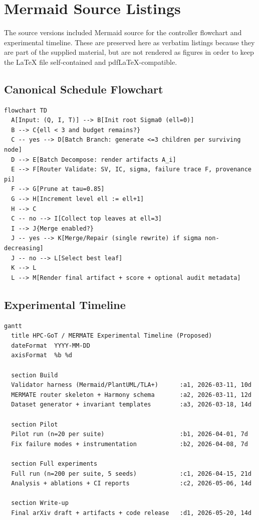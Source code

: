 \documentclass[11pt,a4paper]{article}
\numberwithin{equation}{section}
\theoremstyle{definition}
\begin{document}
\section{Mermaid Source Listings}
\label{app:mermaid}

The source versions included Mermaid source for the controller flowchart and experimental timeline. These are preserved here as verbatim listings because they are part of the supplied material, but are not rendered as figures in order to keep the LaTeX file self-contained and pdf\LaTeX-compatible.

\subsection{Canonical Schedule Flowchart}

\begin{verbatim}
flowchart TD
  A[Input: (Q, I, T)] --> B[Init root Sigma0 (ell=0)]
  B --> C{ell < 3 and budget remains?}
  C -- yes --> D[Batch Branch: generate <=3 children per surviving node]
  D --> E[Batch Decompose: render artifacts A_i]
  E --> F[Router Validate: SV, IC, sigma, failure trace F, provenance pi]
  F --> G[Prune at tau=0.85]
  G --> H[Increment level ell := ell+1]
  H --> C
  C -- no --> I[Collect top leaves at ell=3]
  I --> J{Merge enabled?}
  J -- yes --> K[Merge/Repair (single rewrite) if sigma non-decreasing]
  J -- no --> L[Select best leaf]
  K --> L
  L --> M[Render final artifact + score + optional audit metadata]
\end{verbatim}

\subsection{Experimental Timeline}

\begin{verbatim}
gantt
  title HPC-GoT / MERMATE Experimental Timeline (Proposed)
  dateFormat  YYYY-MM-DD
  axisFormat  %b %d

  section Build
  Validator harness (Mermaid/PlantUML/TLA+)      :a1, 2026-03-11, 10d
  MERMATE router skeleton + Harmony schema       :a2, 2026-03-11, 12d
  Dataset generator + invariant templates        :a3, 2026-03-18, 14d

  section Pilot
  Pilot run (n=20 per suite)                     :b1, 2026-04-01, 7d
  Fix failure modes + instrumentation            :b2, 2026-04-08, 7d

  section Full experiments
  Full run (n=200 per suite, 5 seeds)            :c1, 2026-04-15, 21d
  Analysis + ablations + CI reports              :c2, 2026-05-06, 14d

  section Write-up
  Final arXiv draft + artifacts + code release   :d1, 2026-05-20, 14d
\end{verbatim}
\end{document}
